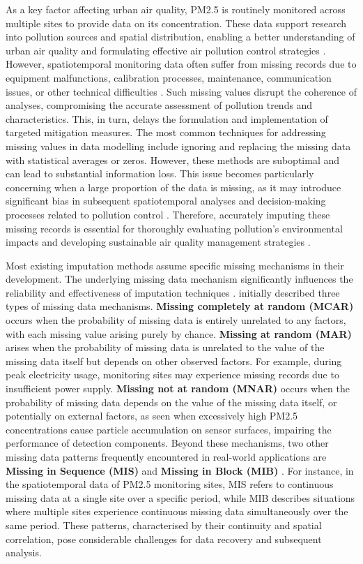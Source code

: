 \documentclass[3p,11pt,authoryear]{elsarticle}
\begin{document}
As a key factor affecting urban air quality, PM2.5 is routinely monitored across multiple sites to provide data on its concentration. These data support research into pollution sources and spatial distribution, enabling a better understanding of urban air quality and formulating effective air pollution control strategies \citep{hedayatzadeh2024pollution}. However, spatiotemporal monitoring data often suffer from missing records due to equipment malfunctions, calibration processes, maintenance, communication issues, or other technical difficulties \citep{Zhu2024AMD}. Such missing values disrupt the coherence of analyses, compromising the accurate assessment of pollution trends and characteristics. This, in turn, delays the formulation and implementation of targeted mitigation measures. The most common techniques for addressing missing values in data modelling include ignoring and replacing the missing data with statistical averages or zeros. However, these methods are suboptimal and can lead to substantial information loss. This issue becomes particularly concerning when a large proportion of the data is missing, as it may introduce significant bias in subsequent spatiotemporal analyses and decision-making processes related to pollution control \citep{zhang2022handling}. 
Therefore, accurately imputing these missing records is essential for thoroughly evaluating pollution's environmental impacts and developing sustainable air quality management strategies \citep{zhao2025spatiotemporal}. 

Most existing imputation methods assume specific missing mechanisms in their development. The underlying missing data mechanism significantly influences the reliability and effectiveness of imputation techniques \citep{kumar2024revitalizing}. \citet{rubin1976inference} initially described three types of missing data mechanisms. 
\textbf{Missing completely at random (MCAR)} occurs when the probability of missing data is entirely unrelated to any factors, with each missing value arising purely by chance. 
\textbf{Missing at random (MAR)} arises when the probability of missing data is unrelated to the value of the missing data itself but depends on other observed factors. For example, during peak electricity usage, monitoring sites may experience missing records due to insufficient power supply. 
\textbf{Missing not at random (MNAR)} occurs when the probability of missing data depends on the value of the missing data itself, or potentially on external factors, as seen when excessively high PM2.5 concentrations cause particle accumulation on sensor surfaces, impairing the performance of detection components.  
Beyond these mechanisms, two other missing data patterns frequently encountered in real-world applications are \textbf{Missing in Sequence (MIS)} and \textbf{Missing in Block (MIB)} \citep{du2024tsi}. 
For instance, in the spatiotemporal data of PM2.5 monitoring sites, MIS refers to continuous missing data at a single site over a specific period, while MIB describes situations where multiple sites experience continuous missing data simultaneously over the same period. These patterns, characterised by their continuity and spatial correlation, pose considerable challenges for data recovery and subsequent analysis.
\end{document}
